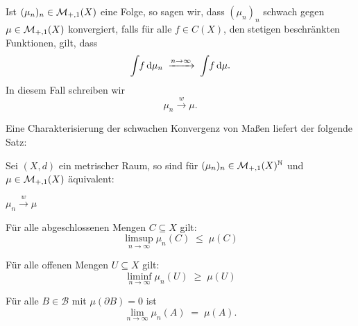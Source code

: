 \documentclass[../main/main.tex]{subfiles}
\begin{document}
	\begin{Definition}
		Ist $(\mu_n)_n \in \mathcal{M}_{+,1}(X)$ eine Folge, so sagen wir, dass $(\mu_n)_n$ 
		schwach gegen $\mu \in \mathcal{M}_{+,1}(X)$ konvergiert, falls für alle $f \in C(X)$, 
		den stetigen beschränkten Funktionen, gilt, dass
		$$\int_{} \, f \, \mathrm{d}\mu_n \; \xrightarrow{n \to \infty} \; \int_{} \, f \, \mathrm{d}\mu \text{.}$$
		In diesem Fall schreiben wir
		$$\mu_n \xrightarrow{w} \mu \text{.}$$
	\end{Definition}

	Eine Charakterisierung der schwachen Konvergenz von Maßen liefert der folgende Satz:

	\begin{Satz}[Portmanteau]
		Sei $(X, d)$ ein metrischer Raum, so sind für $(\mu_n)_n \in \mathcal{M}_{+,1}(X)^{\mathbb{N}}$ 
		und $\mu \in \mathcal{M}_{+,1}(X)$ äquivalent:
		\begin{equivalentthm}
			\item $\mu_n \xrightarrow{w} \mu$
			\item Für alle abgeschlossenen Mengen $C \subseteq X$ gilt: 
				$$\limsup_{n \to \infty} \mu_n(C) \; \leq \; \mu(C)$$
			\item Für alle offenen Mengen $U \subseteq X$ gilt: 
				$$\liminf_{n \to \infty} \mu_n(U) \; \geq \; \mu(U)$$
			\item Für alle $B \in \mathcal{B}$ mit $\mu(\partial B) = 0$ 
				ist $$\lim_{n \to \infty} \mu_n(A) \; = \; \mu(A) \text{.}$$
		\end{equivalentthm}
	\end{Satz}
\end{document}

